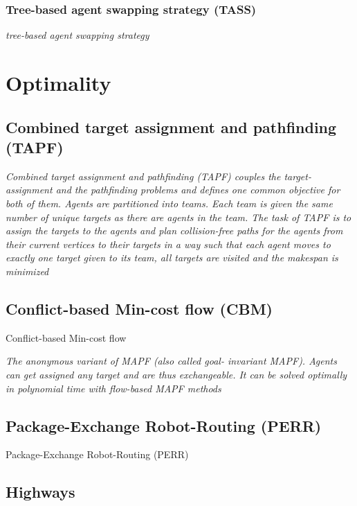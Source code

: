 \documentclass[a4paper,11pt]{article}
\begin{document}
\subsubsection*{Tree-based agent swapping strategy (TASS)}
\textit{tree-based agent swapping strategy}






\section{Optimality}


\subsection{Combined target assignment and pathfinding (TAPF)}

\textit{Combined target assignment and pathfinding (TAPF) couples the target-assignment and the pathfinding problems and defines one common objective for both of them. Agents are partitioned into teams.
Each team is given the same number of unique targets as there are agents in the team. The task of TAPF is to assign the targets to the agents and plan collision-free paths for the agents from their current vertices to their targets in a way such that each agent moves to exactly one target given to its team, all targets are visited and the makespan is minimized}

\subsection{Conflict-based Min-cost flow (CBM)}
Conflict-based Min-cost flow

\textit{The anonymous variant of MAPF (also called goal- invariant MAPF). Agents can get assigned any target and are thus exchangeable. It can be solved optimally in polynomial time with flow-based MAPF methods}

\subsection{Package-Exchange Robot-Routing (PERR)}
Package-Exchange Robot-Routing (PERR)

\subsection{Highways}
\cite{cohen2016bounded}
\end{document}
